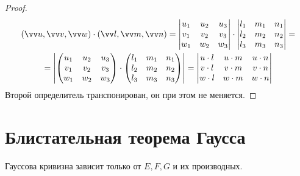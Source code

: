 \begin{proof}
	\begin{multline*}
		(\vv u, \vv v, \vv w) \cdot (\vv l, \vv m, \vv n) =
		\begin{vmatrix}
			u_1 & u_2 & u_3 \\
			v_1 & v_2 & v_3 \\
			w_1 & w_2 & w_3
		\end{vmatrix} \cdot
		\begin{vmatrix}
			l_1 & m_1 & n_1 \\
			l_2 & m_2 & n_2 \\
			l_3 & m_3 & n_3
		\end{vmatrix} = \\
		= \left|
		\begin{pmatrix}
			u_1 & u_2 & u_3 \\
			v_1 & v_2 & v_3 \\
			w_1 & w_2 & w_3
		\end{pmatrix} \cdot
		\begin{pmatrix}
			l_1 & m_1 & n_1 \\
			l_2 & m_2 & n_2 \\
			l_3 & m_3 & n_3
		\end{pmatrix} \right| =
		\begin{vmatrix}
			u \cdot l & u \cdot m & u \cdot n \\
			v \cdot l & v \cdot m & v \cdot n \\
			w \cdot l & w \cdot m & w \cdot n
		\end{vmatrix}
	\end{multline*}
	Второй определитель транспонирован, \as он при этом не меняется.
\end{proof}

\section{Блистательная теорема Гаусса}

\begin{theorem}[Egregium]
	Гауссова кривизна зависит только от $ E, F, G $ и их производных.
\end{theorem}

